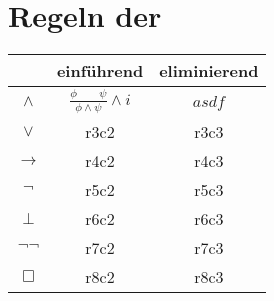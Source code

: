 \appendix



\chapter{Regeln der \ND} %
\label{cha:regeln_der_nd}


\newcommand{\wedgeI}{
	\frac{\phi \qquad \psi}
	{\phi \wedge \psi}
	\wedge i
}

\newcommand{\wedgeE}{
	asdf
}


\begin{center}
	\begin{tabular}{c|cc}
	  & einführend & eliminierend\\
	\hline
	\hline
	$\wedge$ 			& $\wedgeI$ & $\wedgeE$\\
	$\vee$ 				& r3c2 & r3c3\\
	$\rightarrow$ & r4c2 & r4c3\\
	$\neg$ 				& r5c2 & r5c3\\
	$\bot$ 				& r6c2 & r6c3\\
	$\neg \neg$ 	& r7c2 & r7c3\\
	$\Box$ 				& r8c2 & r8c3\\
	\end{tabular}
\end{center}

